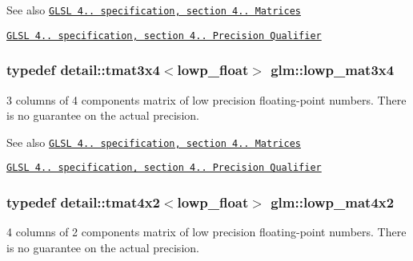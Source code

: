 \begin{DoxySeeAlso}{\-See also}
\href{http://www.opengl.org/registry/doc/GLSLangSpec.4.20.8.pdf}{\tt \-G\-L\-S\-L 4.. specification, section 4.. \-Matrices} 

\href{http://www.opengl.org/registry/doc/GLSLangSpec.4.20.8.pdf}{\tt \-G\-L\-S\-L 4.. specification, section 4.. \-Precision \-Qualifier} 
\end{DoxySeeAlso}
\hypertarget{group__core__precision_ga1b202ac2d7cea4f30ad802471f6081ac}{
\subsubsection[{lowp\-\_\-mat3x4}]{\setlength{\rightskip}{0pt plus 5cm}typedef detail\-::tmat3x4$<$lowp\-\_\-float$>$ {\bf glm\-::lowp\-\_\-mat3x4}}}\label{group__core__precision_ga1b202ac2d7cea4f30ad802471f6081ac}
3 columns of 4 components matrix of low precision floating-\/point numbers. \-There is no guarantee on the actual precision.

\begin{DoxySeeAlso}{\-See also}
\href{http://www.opengl.org/registry/doc/GLSLangSpec.4.20.8.pdf}{\tt \-G\-L\-S\-L 4.. specification, section 4.. \-Matrices} 

\href{http://www.opengl.org/registry/doc/GLSLangSpec.4.20.8.pdf}{\tt \-G\-L\-S\-L 4.. specification, section 4.. \-Precision \-Qualifier} 
\end{DoxySeeAlso}
\hypertarget{group__core__precision_gaf8f0828066f6c6fbd2c815832743e401}{
\subsubsection[{lowp\-\_\-mat4x2}]{\setlength{\rightskip}{0pt plus 5cm}typedef detail\-::tmat4x2$<$lowp\-\_\-float$>$ {\bf glm\-::lowp\-\_\-mat4x2}}}\label{group__core__precision_gaf8f0828066f6c6fbd2c815832743e401}
4 columns of 2 components matrix of low precision floating-\/point numbers. \-There is no guarantee on the actual precision.

